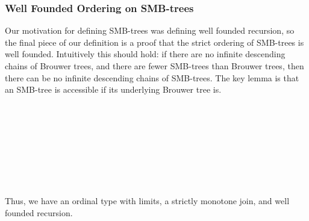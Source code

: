\subsubsection{Well Founded Ordering on SMB-trees}
Our motivation for defining SMB-trees was defining well founded recursion,
so the final piece of our definition is a proof that the strict ordering of
SMB-trees is well founded.
Intuitively this should hold: if there are no infinite descending chains
of Brouwer trees, and there are fewer SMB-trees than Brouwer trees, then
there can be no infinite descending chains of SMB-trees.
The key lemma is that an SMB-tree is accessible if its underlying Brouwer tree is.
\begin{code}%
%
\>[2]\AgdaSpace{}%
\AgdaSymbol{:}\AgdaSpace{}%
\AgdaSpace{}%
\AgdaOperator{\AgdaFunction{\AgdaUnderscore{}<\AgdaUnderscore{}}}\<%
\\
%
\>[2]\AgdaSpace{}%
\AgdaSpace{}%
\AgdaSymbol{=}\AgdaSpace{}%
\AgdaSpace{}%
\AgdaSymbol{(}\AgdaSpace{}%
\AgdaSymbol{(}\AgdaSpace{}%
\AgdaSymbol{))}\<%
\\
\>[2][@{}l@{\AgdaIndent{0}}]%
\>[4]\<%
\\
\>[4][@{}l@{\AgdaIndent{0}}]%
\>[6]\AgdaSpace{}%
\AgdaSymbol{:}\AgdaSpace{}%
\AgdaSpace{}%
\AgdaSymbol{\{}\AgdaSymbol{\}}\<%
\\
\>[6][@{}l@{\AgdaIndent{0}}]%
\>[8]\AgdaSpace{}%
\AgdaSpace{}%
\AgdaSpace{}%
\AgdaSymbol{(}\AgdaSpace{}%
\AgdaSymbol{)}\<%
\\
%
\>[8]\AgdaSpace{}%
\AgdaSpace{}%
\AgdaOperator{\AgdaFunction{\AgdaUnderscore{}<\AgdaUnderscore{}}}\AgdaSpace{}%
\<%
\\
%
\>[6]\AgdaSpace{}%
\AgdaSymbol{\{}\AgdaSymbol{\}}\AgdaSpace{}%
\AgdaSymbol{(}\AgdaSpace{}%
\AgdaSymbol{)}\<%
\\
\>[6][@{}l@{\AgdaIndent{0}}]%
\>[8]\AgdaSymbol{=}\AgdaSpace{}%
\AgdaSpace{}%
\AgdaSpace{}%
\AgdaSpace{}%
\AgdaSpace{}%
\AgdaSpace{}%
\AgdaSpace{}%
\AgdaSymbol{(}\AgdaSpace{}%
\AgdaSymbol{(}\AgdaSpace{}%
\AgdaSymbol{)}\AgdaSpace{}%
\AgdaSymbol{(}\AgdaSpace{}%
\AgdaSymbol{))))}\<%
\end{code}

Thus, we have an ordinal type with limits, a strictly monotone join,
and well founded recursion.



